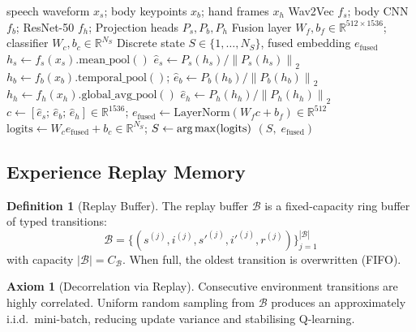 \documentclass[12pt,a4paper]{article}
\theoremstyle{definition}
\newtheorem{definition}{Definition}[section]
\newtheorem{axiom}{Axiom}[section]
\theoremstyle{plain}
\theoremstyle{remark}
\newcommand{\R}{\mathbb{R}}
\newcommand{\Norm}[1]{\left\|#1\right\|}
\newcommand{\LN}{\mathrm{LayerNorm}}
\newcommand{\argmax}{\operatornamewithlimits{arg\,max}}
\begin{document}
\begin{algorithm}[H]
\caption{Sub-Classifier Forward Pass: Multimodal State Encoding}
\label{alg:subclassifier}
\begin{algorithmic}[1]
\Require speech waveform $x_s$; body keypoints $x_b$; hand frames $x_h$
\Require Wav2Vec $f_s$; body CNN $f_b$; ResNet-50 $f_h$; Projection heads $P_s, P_b, P_h$
\Require Fusion layer $W_f, b_f \in \R^{512 \times 1536}$; classifier $W_c, b_c \in \R^{N_S}$
\Ensure Discrete state $S \in \{1,\ldots,N_S\}$, fused embedding $e_{\text{fused}}$
\State $h_s \gets f_s(x_s).\text{mean\_pool}()$ 
\State $\hat{e}_s \gets P_s(h_s) / \Norm{P_s(h_s)}_2$ 
\State $h_b \gets f_b(x_b).\text{temporal\_pool}()$; $\hat{e}_b \gets P_b(h_b) / \Norm{P_b(h_b)}_2$
\State $h_h \gets f_h(x_h).\text{global\_avg\_pool}()$ 
\State $\hat{e}_h \gets P_h(h_h) / \Norm{P_h(h_h)}_2$ \Comment{$[512]$}
\State $c \gets [\hat{e}_s;\, \hat{e}_b;\, \hat{e}_h] \in \R^{1536}$; $e_{\text{fused}} \gets \LN(W_f c + b_f) \in \R^{512}$
\State $\text{logits} \gets W_c e_{\text{fused}} + b_c \in \R^{N_S}$; $S \gets \argmax(\text{logits})$
\State \Return $(S,\; e_{\text{fused}})$
\end{algorithmic}
\end{algorithm}

\subsection{Experience Replay Memory}

\begin{definition}[Replay Buffer]
The replay buffer $\mathcal{B}$ is a fixed-capacity ring buffer of typed transitions:
\[
  \mathcal{B} = \{(s^{(j)}, i^{(j)}, {s'}^{(j)}, {i'}^{(j)}, r^{(j)})\}_{j=1}^{|\mathcal{B}|}
\]
with capacity $|\mathcal{B}| = C_{\mathcal{B}}$. When full, the oldest transition is overwritten (FIFO).
\end{definition}

\begin{axiom}[Decorrelation via Replay]
Consecutive environment transitions are highly correlated. Uniform random sampling from $\mathcal{B}$ produces an approximately i.i.d.\ mini-batch, reducing update variance and stabilising Q-learning.
\end{axiom}
\end{document}
